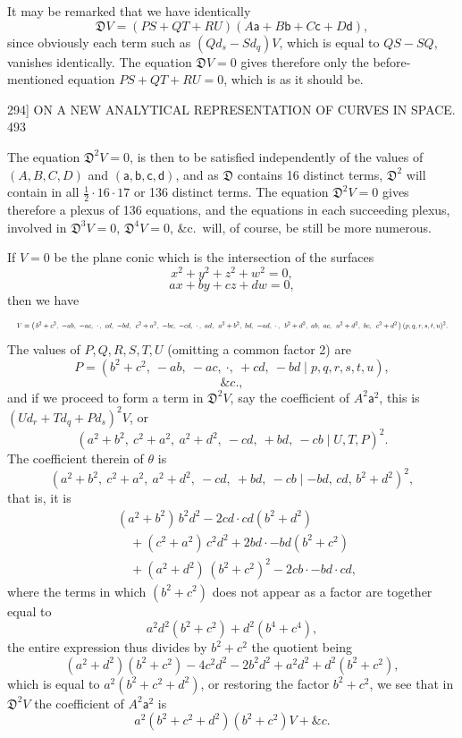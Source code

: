 \documentclass[11pt]{article}
\begin{document}
It may be remarked that we have identically
\[ \mathfrak{D}V=(PS+QT+RU)(A\mathsf{a}+B\mathsf{b}+C\mathsf{c}+D\mathsf{d}), \]
since obviously each term such as $(Qd_{s}-Sd_{q})V$, which is equal to $QS-SQ$, vanishes
identically. The equation $\mathfrak{D}V=0$ gives therefore only the before-mentioned equation
$PS+QT+RU=0$, which is as it should be.

\newpage
\begin{center}
\textsc{294]} \hfill ON A NEW ANALYTICAL REPRESENTATION OF CURVES IN SPACE. \hfill 493
\end{center}

The equation $\mathfrak{D}^{2}V=0$, is then to be satisfied independently of the values of
$(A,B,C,D)$ and $(\mathsf{a},\mathsf{b},\mathsf{c},\mathsf{d})$, and as $\mathfrak{D}$ contains 16 distinct terms, $\mathfrak{D}^{2}$ will contain in
all $\tfrac{1}{2}\cdot 16\cdot 17$ or 136 distinct terms. The equation $\mathfrak{D}^{2}V=0$ gives therefore a plexus of
136 equations, and the equations in each succeeding plexus, involved in $\mathfrak{D}^{3}V=0$,
$\mathfrak{D}^{4}V=0$, \&c.\ will, of course, be still be more numerous.

If $V=0$ be the plane conic which is the intersection of the surfaces
\[ x^{2}+y^{2}+z^{2}+w^{2}=0, \]
\[ ax+by+cz+dw=0, \]
then we have
\[ \resizebox{\textwidth}{!}{$\displaystyle
V=\bigl(\,b^{2}+c^{2},\ -ab,\ -ac,\ \cdot\,,\ cd,\ -bd,\ \,c^{2}+a^{2},\ -bc,\ -cd,\ \cdot\,,\ ad,\ \,a^{2}+b^{2},\ bd,\ -ad,\ \cdot\,,\ \,b^{2}+d^{2},\ ab,\ ac,\ \,a^{2}+d^{2},\ bc,\ \,c^{2}+d^{2}\,\bigr)\,(p,q,r,s,t,u)^{2}. $} \]
The values of $P,Q,R,S,T,U$ (omitting a common factor 2) are
\[ P=(b^{2}+c^{2},\ -ab,\ -ac,\ \cdot,\ +cd,\ -bd \mid p,q,r,s,t,u), \]
\[ \&c., \]
and if we proceed to form a term in $\mathfrak{D}^{2}V$, say the coefficient of $A^{2}\mathsf{a}^{2}$, this is
$(Ud_{r}+Td_{q}+Pd_{s})^{2}V$, or
\[ (a^{2}+b^{2},\ c^{2}+a^{2},\ a^{2}+d^{2},\ -cd,\ +bd,\ -cb \mid U,T,P)^{2}. \]
The coefficient therein of $\theta$ is
\[ (a^{2}+b^{2},\ c^{2}+a^{2},\ a^{2}+d^{2},\ -cd,\ +bd,\ -cb \mid -bd,\,cd,\,b^{2}+d^{2})^{2}, \]
that is, it is
\[ \begin{aligned}
&(a^{2}+b^{2})\,b^{2}d^{2} - 2cd\cdot cd(b^{2}+d^{2})\\
&\quad +(c^{2}+a^{2})\,c^{2}d^{2} + 2bd\cdot -bd(b^{2}+c^{2})\\
&\quad +(a^{2}+d^{2})\,(b^{2}+c^{2})^{2} - 2cb\cdot -bd\cdot cd,
\end{aligned} \]
where the terms in which $(b^{2}+c^{2})$ does not appear as a factor are together equal to
\[ a^{2}d^{2}(b^{2}+c^{2})+d^{2}(b^{4}+c^{4}), \]
the entire expression thus divides by $b^{2}+c^{2}$ the quotient being
\[ (a^{2}+d^{2})(b^{2}+c^{2})-4c^{2}d^{2}-2b^{2}d^{2}+a^{2}d^{2}+d^{2}(b^{2}+c^{2}), \]
which is equal to $a^{2}(b^{2}+c^{2}+d^{2})$, or restoring the factor $b^{2}+c^{2}$, we see that in $\mathfrak{D}^{2}V$
the coefficient of $A^{2}\mathsf{a}^{2}$ is
\[ a^{2}(b^{2}+c^{2}+d^{2})(b^{2}+c^{2})V+\&c. \]
\end{document}
